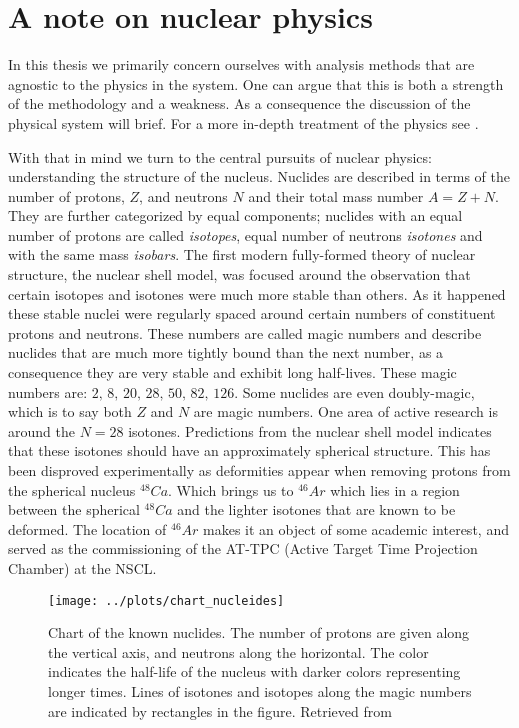 

\section{A note on nuclear physics}

In this thesis we primarily concern ourselves with analysis methods that are agnostic to the physics in the system. One can argue that this is both a strength of the methodology and a weakness. As a consequence the discussion of the physical system will brief. For a more in-depth treatment of the physics  see \cite{Bradt2017}. 

With that in mind we turn to the central pursuits of nuclear physics: understanding the structure of the nucleus. Nuclides are described in terms of the number of protons, $Z$, and neutrons $N$ and their total mass number $A = Z +N$. They are further categorized by equal components; nuclides with an equal number of protons are called \textit{isotopes}, equal number of neutrons \textit{isotones} and with the same  mass \textit{isobars}. The first modern fully-formed theory of nuclear structure, the nuclear shell model, was focused around the observation that certain isotopes and isotones were much more stable than others. As it happened these stable nuclei were regularly spaced around certain numbers of constituent protons and neutrons. These numbers are called magic numbers and describe nuclides that are much more tightly bound than the next number, as a consequence they are very stable and exhibit long half-lives. These magic numbers are: $2 ,\, 8 ,\, 20 ,\, 28 ,\, 50 ,\, 82 ,\, 126$. Some nuclides are even doubly-magic, which is to say both $Z$ and $N$ are magic numbers. One area of active research is around the $N=28$ isotones. Predictions from the nuclear shell model indicates that these isotones should have an approximately spherical structure. This has been disproved experimentally as deformities appear when removing protons from the spherical nucleus ${}^{48}Ca$. Which brings us to ${}^{46}Ar$ which lies in a region between the spherical ${}^{48}Ca$ and the lighter isotones that are known to be deformed. The location of ${}^{46}Ar$ makes it an object of some academic interest, and served as the commissioning of the AT-TPC (Active Target Time Projection Chamber) at the NSCL. 


\begin{figure}
\centering
\texttt{[image: ../plots/chart\_nucleides]}
\caption[Chart of the nuclides]{Chart of the known nuclides. The number of protons are given along the vertical axis, and neutrons along the horizontal. The color indicates the half-life of the nucleus with darker colors representing longer times. Lines of isotones and isotopes along the magic numbers are indicated by rectangles in the figure. Retrieved from \cite{Sonzogni2019}}
\end{figure}

